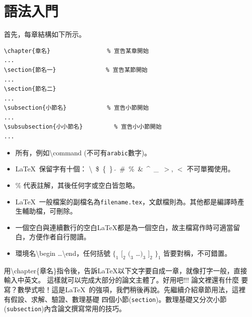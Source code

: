 \chapter{\protect 語法入門}
首先，每章結構如下所示。

\begin{Verbatim}[frame=single,firstline=1,label=Every chapter]
\chapter{章名}   　　　　　　　　% 宣告某章開始
...
\section{節名一}　　　　　　　　 % 宣告某節開始
...
\section{節名二}
...
\subsection{小節名}　　　　　　　% 宣告小節開始
...
\subsubsection{小小節名}         % 宣告小小節開始
...
\end{Verbatim}
\begin{itemize}
\item 所有，例如\textbackslash command (不可有{\tt arabic}數字)。
\item \LaTeX\ 保留字有十個： \textbackslash\  \$\ \{\ \}\ $\tilde{}$\ \#\ \%\ \&\ \textasciicircum\
 \_\ $>$, $<$ 不可單獨使用。  
\item \% 代表註解，其後任何字或空白皆忽略。
\item \LaTeX\ 一般檔案的副檔名為{\tt filename.tex}，文獻檔則為。其他都是編譯時產生輔助檔，可刪除。
\item 一個空白與連續數行的空白\LaTeX{}都是為一個空白，故主檔寫作時可適當留白，方便作者自行閱讀。
\item 環境名\textbackslash begin \ldots \textbackslash end，任何括號 $\{_1$ $[_2$ $(_{3}$ \ldots $)_3$ $]_2$ $\}_1$ 皆要對稱，不可錯置。
\end{itemize}
用{\textbackslash chapter\{章名\}}指令後，告訴\LaTeX{}以下文字要自成一章，就像打字一般，直接輸入中英文。
這樣就可以完成大部分的論文主體了。好用吧!!! 論文裡還有什麼
要寫？數學式啦！這是\LaTeX\ 的強項，我們稍後再說。先繼續介紹章節用法，這裡有假設、求解、驗證、數理基礎 四個小節({\tt section})。數理基礎又分次小節({\tt subsection})內含論文撰寫常用的技巧。

